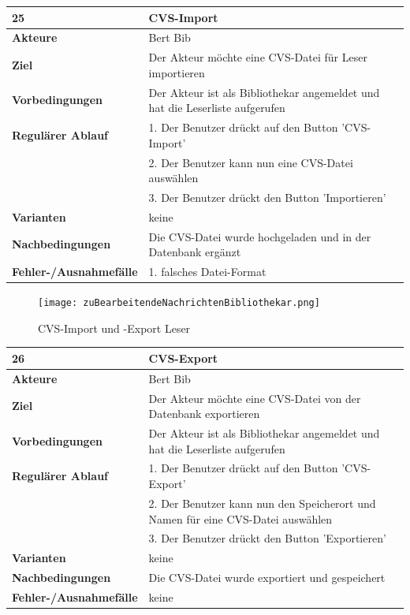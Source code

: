\documentclass[fontsize=12pt,paper=a4,twoside]{scrartcl}
\begin{document}
\begin{table}
	[H] \label{25} 
	\begin{tabular}
		{|l|p{10cm}|} \hline \textbf{25} & \textbf{CVS-Import} \\
		\hline \textbf{Akteure} & Bert Bib\\
		\hline \textbf{Ziel} & Der Akteur möchte eine CVS-Datei für Leser importieren \\
		\hline \textbf{Vorbedingungen} & Der Akteur ist als Bibliothekar angemeldet und hat die Leserliste aufgerufen\\
		\hline \textbf{Regulärer Ablauf} & 1. Der Benutzer drückt auf den Button 'CVS-Import' \\
		&2. Der Benutzer kann nun eine CVS-Datei auswählen\\
		&3. Der Benutzer drückt den Button 'Importieren'\\
		\hline \textbf{Varianten} & keine \\
		\hline \textbf{Nachbedingungen} & Die CVS-Datei wurde hochgeladen und in der Datenbank ergänzt\\
		\hline \textbf{Fehler-/Ausnahmefälle} & 1. falsches Datei-Format\\
		\hline 
	\end{tabular}
\end{table}
\begin{figure}
	[H] \caption{CVS-Import und -Export Leser} 
	\texttt{[image: zuBearbeitendeNachrichtenBibliothekar.png]} \label{pic:CVS-ImportLeser} 
\end{figure}
\begin{table}
	[H] \label{26} 
	\begin{tabular}
		{|l|p{10cm}|} \hline \textbf{26} & \textbf{CVS-Export} \\
		\hline \textbf{Akteure} & Bert Bib\\
		\hline \textbf{Ziel} & Der Akteur möchte eine CVS-Datei von der Datenbank exportieren \\
		\hline \textbf{Vorbedingungen} & Der Akteur ist als Bibliothekar angemeldet und hat die Leserliste aufgerufen \\
		\hline \textbf{Regulärer Ablauf} & 1. Der Benutzer drückt auf den Button 'CVS-Export' \\
		&2. Der Benutzer kann nun den Speicherort und Namen für eine CVS-Datei auswählen\\
		&3. Der Benutzer drückt den Button 'Exportieren'\\
		\hline \textbf{Varianten} & keine \\
		\hline \textbf{Nachbedingungen} & Die CVS-Datei wurde exportiert und gespeichert\\
		\hline \textbf{Fehler-/Ausnahmefälle} & keine\\
		\hline 
	\end{tabular}
\end{table}
\end{document}
